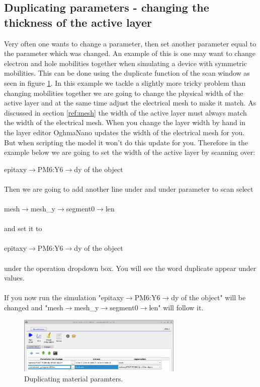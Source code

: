 \subsection{Duplicating parameters - changing the thickness of the active layer}

Very often one wants to change a parameter, then set another parameter equal to the parameter which was changed. An example of this is one may want to change electron and hole mobilities together when simulating a device with symmetric mobilities. This can be done using the duplicate function of the scan window as seen in figure \ref{fig:scanduplicate}.  In this example we tackle a slightly more tricky problem than changing mobilities together we are going to change the physical width of the active layer and at the same time adjust the electrical mesh to make it match.  As discussed in section \ref{ref:mesh} the width of the active layer must always match the width of the electrical mesh.  When you change the layer width by hand in the layer editor OghmaNano updates the width of the electrical mesh for you. But when scripting the model it won't do this update for you.  Therefore in the example below we are going to set the width of the active layer by scanning over:

epitaxy$\rightarrow$PM6:Y6$\rightarrow$dy of the object
\\
\\
Then we are going to add another line under and under parameter to scan select
\\
\\
mesh$\rightarrow$mesh\_y$\rightarrow$segment0$\rightarrow$len
\\
\\
and set it to
\\
\\
epitaxy$\rightarrow$PM6:Y6$\rightarrow$dy of the object
\\
\\
under the operation dropdown box. You will see the word duplicate appear under values.
\\
\\
If you now run the simulation "epitaxy$\rightarrow$PM6:Y6$\rightarrow$dy of the object" will be changed and "mesh$\rightarrow$mesh\_y$\rightarrow$segment0$\rightarrow$len" will follow it.


\begin{figure}[H]
\centering
\includegraphics[width=0.7\textwidth]{./images/param_scan_duplicate.png}
\caption{Duplicating material paramters.}
\label{fig:scanduplicate}
\end{figure}

